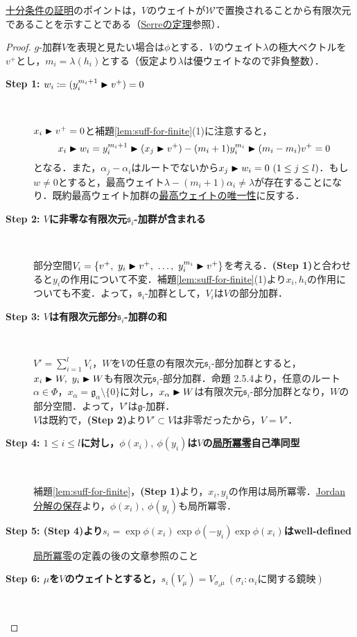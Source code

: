 \documentclass[rep_main]{subfiles}
\begin{document}
\hyperref[thm:suff-for-finite]{十分条件の証明}のポイントは，$V$のウェイトが$\mathscr{W}$で置換されることから有限次元であることを示すことである（\hyperref[thm:Serre]{Serreの定理}参照）．
\begin{proof}
	$g$-加群$V$を表現と見たい場合は$\phi$とする．$V$のウェイト$\lambda$の極大ベクトルを$v^+$とし，$m_i = \lambda(h_i)$とする（仮定より$\lambda$は優ウェイトなので非負整数）．
	\begin{description}
		\item[\textbf{Step 1: $w_i \coloneqq (y_i^{m_i + 1} \blacktriangleright v^+) = 0$}]　
		
		$x_i \blacktriangleright v^+ = 0$と補題\ref{lem:suff-for-finite}(1)に注意すると，
		\begin{equation}
			x_i \blacktriangleright w_i = y_i^{m_i + 1} \blacktriangleright (x_j \blacktriangleright v^+) - (m_i + 1)y_i^{m_i} \blacktriangleright (m_i - m_i)v^+ = 0
		\end{equation}
		となる．また，$\alpha_j - \alpha_i$はルートでないから$x_j \blacktriangleright w_i = 0\ (1 \leq j \leq l)$．もし$w \neq 0$とすると，最高ウェイト$\lambda - (m_i + 1)\alpha_i \neq \lambda$が存在することになり．既約最高ウェイト加群の\hyperref[col:highest-weight-uni]{最高ウェイトの唯一性}に反する．
		\item[\textbf{Step 2: $V$に非零な有限次元$\mathfrak{s}_i$-加群が含まれる}] 　
		
		部分空間$V_i = \{v^+,\ y_i \btr v^+,\ \ldots,\ y_i^{m_i}\btr v^+ \}$を考える．\textbf{(Step 1)}と合わせると$y_i$の作用について不変．補題\ref{lem:suff-for-finite}(1)より$x_i, h_i$の作用についても不変．よって，$\mathfrak{s}_i$-加群として，$V_i$は$V$の部分加群．
		\item[\textbf{Step 3: $V$は有限次元部分$\mathfrak{s}_i$-加群の和}] 　
		
		$V' = \sum_{i = 1}^l V_i$，$W$を$V$の任意の有限次元$\mathfrak{s}_i$-部分加群とすると，$x_i \blacktriangleright W,\ y_i \blacktriangleright W$も有限次元$\mathfrak{s}_i$-部分加群．命題 2.5.4より，任意のルート$\alpha \in \Phi$，$x_\alpha = \mathfrak{g}_\alpha \setminus \{0\}$に対し，$x_\alpha \blacktriangleright W$は有限次元$\mathfrak{s}_i$-部分加群となり，$W$の部分空間．よって，$V'$は$\mathfrak{g}$-加群．\\
		$V$は既約で，\textbf{(Step 2)}より$V' \subset V$は非零だったから，$V = V'$．
		\item[\textbf{Step 4: $1 \leq i \leq l$に対し，$\phi(x_i),\ \phi(y_i)$は$V$の\hyperref[def:locally-nilpotent]{局所冪零}自己準同型}]　
		
		補題\ref{lem:suff-for-finite}，\textbf{(Step 1)}より，$x_i, y_i$の作用は局所冪零．\hyperref[col:JC]{Jordan分解の保存}より，$\phi(x_i),\ \phi(y_i)$も局所冪零．
		\item[\textbf{Step 5: (Step 4)より$s_i = \exp\phi(x_i)\exp\phi(-y_i)\exp\phi(x_i)$はwell-defined}] \hyperref[def:locally-nilpotent]{局所冪零}の定義の後の文章参照のこと
		\item[\textbf{Step 6: $\mu$を$V$のウェイトとすると，$s_i(V_\mu) = V_{\sigma_i\mu}\ (\sigma_i: \alpha_i\text{に関する鏡映})$}]　
		

\end{description}
\end{proof}
\end{document}

